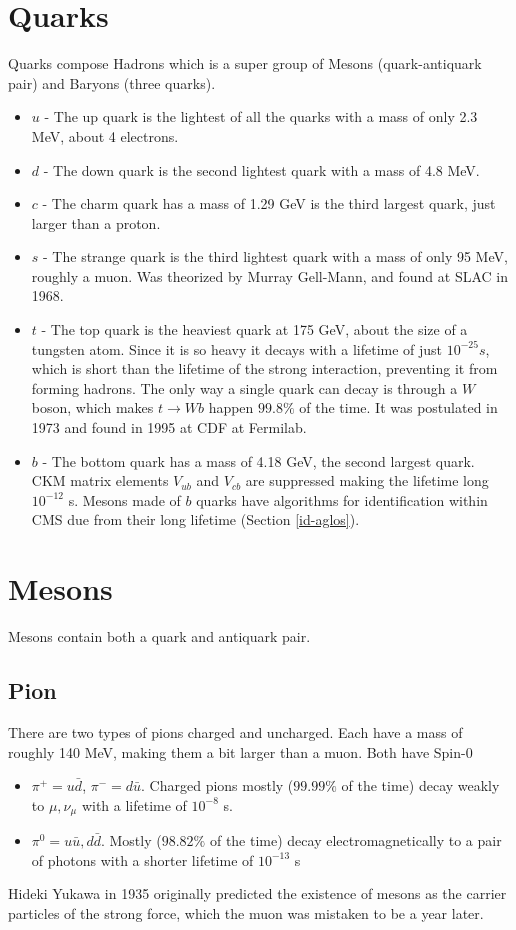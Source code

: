 \section{Quarks}
Quarks compose Hadrons which is a super group of Mesons (quark-antiquark pair) and Baryons (three quarks).
\begin{itemize}
    \item $u$ - The up quark is the lightest of all the quarks with a mass of only 2.3 MeV, about 4 electrons.
    \item $d$ - The down quark is the second lightest quark with a mass of 4.8 MeV.
    \item $c$ - The charm quark has a mass of 1.29 GeV is the third largest quark, just larger than a proton.
    \item $s$ - The strange quark is the third lightest quark with a mass of only 95 MeV, roughly a muon. Was theorized by Murray Gell-Mann, and found at SLAC in 1968.
    \item $t$ - The top quark is the heaviest quark at 175 GeV, about the size of a tungsten atom. Since it is so heavy it decays with a lifetime of just $10^{-25}s$, which is short than the lifetime of the strong interaction, preventing it from forming hadrons. The only way a single quark can decay is through a $W$ boson, which makes $t\rightarrow Wb$ happen $99.8\%$ of the time. It was postulated in 1973 and found in 1995 at CDF at Fermilab.
    \item $b$ - The bottom quark has a mass of 4.18 GeV, the second largest quark. CKM matrix elements $V_{ub}$ and $V_{cb}$ are suppressed making the lifetime long $10^{-12}$ s. Mesons made of $b$ quarks have algorithms for identification within CMS due from their long lifetime (Section \ref{id-aglos}).
\end{itemize}

\section{Mesons}
Mesons contain both a quark and antiquark pair.

\subsection{Pion}
There are two types of pions charged and uncharged. Each have a mass of roughly 140 MeV, making them a bit larger than a muon. Both have Spin-0
\begin{itemize}
    \item $\pi^+ = u\bar{d}$, $\pi^- = d\bar{u}$. Charged pions mostly ($99.99\%$ of the time) decay weakly to $\mu, \nu_\mu$ with a lifetime of $10^{-8}$ s.
    \item $\pi^0 = u\bar{u}, d\bar{d}$. Mostly ($98.82\%$ of the time) decay electromagnetically to a pair of photons with a shorter lifetime of $10^{-13}$ s
\end{itemize}
Hideki Yukawa in 1935 originally predicted the existence of mesons as the carrier particles of the strong force, which the muon was mistaken to be a year later.


